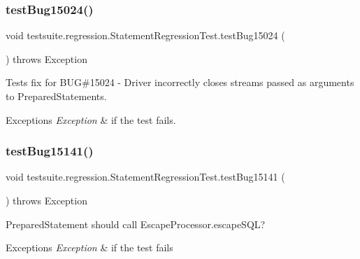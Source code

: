\subsubsection{\texorpdfstring{test\+Bug15024()}{testBug15024()}}
{\footnotesize\ttfamily void testsuite.\+regression.\+Statement\+Regression\+Test.\+test\+Bug15024 (\begin{DoxyParamCaption}{ }\end{DoxyParamCaption}) throws Exception}

Tests fix for B\+UG\#15024 -\/ Driver incorrectly closes streams passed as arguments to Prepared\+Statements.


\begin{DoxyExceptions}{Exceptions}
{\em Exception} & if the test fails. \\
\hline
\end{DoxyExceptions}
\mbox{\label{classtestsuite_1_1regression_1_1_statement_regression_test_a8a46a6b40cf258db53a37cc247872520}} 
\subsubsection{\texorpdfstring{test\+Bug15141()}{testBug15141()}}
{\footnotesize\ttfamily void testsuite.\+regression.\+Statement\+Regression\+Test.\+test\+Bug15141 (\begin{DoxyParamCaption}{ }\end{DoxyParamCaption}) throws Exception}

Prepared\+Statement should call Escape\+Processor.\+escape\+S\+QL?


\begin{DoxyExceptions}{Exceptions}
{\em Exception} & if the test fails \\
\hline
\end{DoxyExceptions}
\mbox{\label{classtestsuite_1_1regression_1_1_statement_regression_test_a8077d99b51217d8479e3637eac582d17}} 
